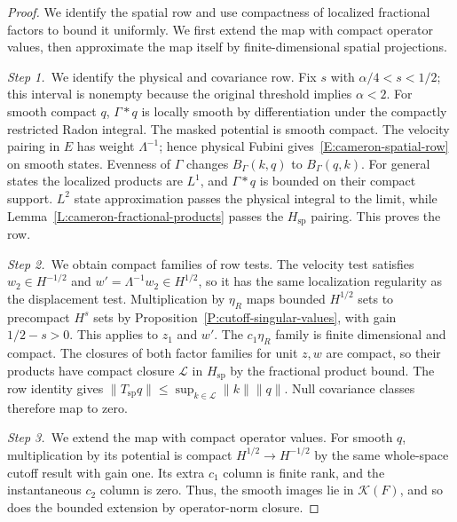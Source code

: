 \begin{proof}
  We identify the spatial row and use compactness of localized fractional
  factors to bound it uniformly. We first extend the map with compact operator
  values, then approximate the map itself by finite-dimensional spatial
  projections.


  \medskip
  \noindent\textit{Step 1.~}We identify the physical and covariance row.
  Fix $s$ with $\alpha/4 < s < 1/2$; this interval is nonempty because the
  original threshold implies $\alpha < 2$. For smooth compact $q$, $\Gamma*q$ is
  locally smooth by differentiation under the compactly restricted Radon
  integral. The masked potential is smooth compact. The velocity pairing in $E$
  has weight $\Lambda^{-1}$; hence physical Fubini
  gives~\eqref{E:cameron-spatial-row} on smooth states. Evenness of $\Gamma$
  changes $B_\Gamma(k,q)$ to $B_\Gamma(q,k)$. For general states the localized
  products are $L^1$, and $\Gamma*q$ is bounded on their compact support. $L^2$
  state approximation passes the physical integral to the limit, while
  Lemma~\ref{L:cameron-fractional-products} passes the $H_{\mathrm{sp}}$
  pairing. This proves the row.


  \medskip
  \noindent\textit{Step 2.~}We obtain compact families of row tests.
  The velocity test satisfies $w_2\in H^{-1/2}$ and $w'=\Lambda^{-1}w_2\in
  H^{1/2}$, so it has the same localization regularity as the displacement
  test.
  Multiplication by $\eta_R$ maps bounded $H^{1/2}$ sets to precompact $H^s$
  sets by Proposition~\ref{P:cutoff-singular-values}, with gain $1/2-s > 0$.
  This applies to $z_1$ and $w'$. The $c_1\eta_R$ family is finite dimensional
  and compact. The closures of both factor families for unit $z,w$ are compact,
  so their products have compact closure $\mathcal{L}$ in $H_{\mathrm{sp}}$ by
  the fractional product bound. The row identity gives $\|T_{\mathrm{sp}}q\| \le
  \sup_{k\in\mathcal{L}}\|k\|\|q\|$. Null covariance classes therefore map to
  zero.


  \medskip
  \noindent\textit{Step 3.~}We extend the map with compact operator values.
  For smooth $q$, multiplication by its potential is compact $H^{1/2} \to
  H^{-1/2}$ by the same whole-space cutoff result with gain one. Its extra $c_1$
  column is finite rank, and the instantaneous $c_2$ column is zero. Thus, the
  smooth images lie in $\mathcal{K}(F)$, and so does the bounded extension by
  operator-norm closure.



\end{proof}

